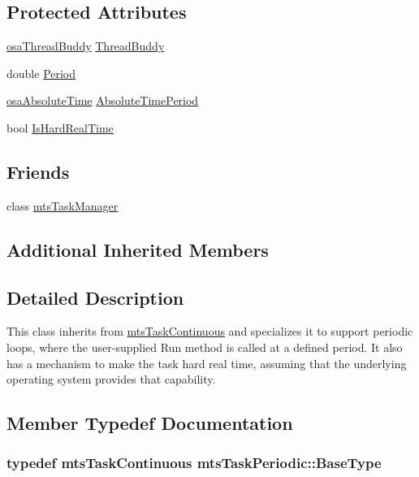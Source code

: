 \subsection*{Protected Attributes}
\begin{DoxyCompactItemize}
\item 
\hyperlink{classosa_thread_buddy}{osa\-Thread\-Buddy} \hyperlink{classmts_task_periodic_a8658fffa3b56f91a7853c20bd622c069}{Thread\-Buddy}
\item 
double \hyperlink{classmts_task_periodic_a8453eaab96a98c048192d7511f263988}{Period}
\item 
\hyperlink{structosa_absolute_time}{osa\-Absolute\-Time} \hyperlink{classmts_task_periodic_a1e5e04be2039534dd19d645be4e7da60}{Absolute\-Time\-Period}
\item 
bool \hyperlink{classmts_task_periodic_a84c05c06ebc6938d0c7ee007ea41a470}{Is\-Hard\-Real\-Time}
\end{DoxyCompactItemize}
\subsection*{Friends}
\begin{DoxyCompactItemize}
\item 
class \hyperlink{classmts_task_periodic_a21d47396ed8d4c10b5acd6a083b219f9}{mts\-Task\-Manager}
\end{DoxyCompactItemize}
\subsection*{Additional Inherited Members}


\subsection{Detailed Description}
This class inherits from \hyperlink{classmts_task_continuous}{mts\-Task\-Continuous} and specializes it to support periodic loops, where the user-\/supplied Run method is called at a defined period. It also has a mechanism to make the task hard real time, assuming that the underlying operating system provides that capability. 

\subsection{Member Typedef Documentation}
\hypertarget{classmts_task_periodic_ae0e61abd9d99d5c58d97bfd2401ebd6e}{
\subsubsection[{Base\-Type}]{\setlength{\rightskip}{0pt plus 5cm}typedef {\bf mts\-Task\-Continuous} {\bf mts\-Task\-Periodic\-::\-Base\-Type}}}\label{classmts_task_periodic_ae0e61abd9d99d5c58d97bfd2401ebd6e}


